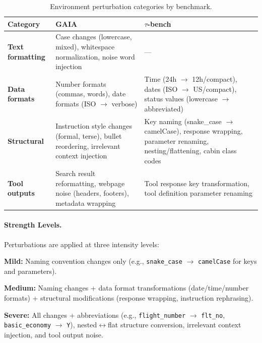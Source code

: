 \documentclass[11pt]{article}
\begin{document}
\begin{table}[h]
\centering
\renewcommand{\arraystretch}{1.2}
\small
\caption{Environment perturbation categories by benchmark.}
\label{tab:structural_perturbations}
\begin{tabularx}{\linewidth}{l X X}
\toprule
\textbf{Category} & \textbf{GAIA} & \textbf{$\tau$-bench} \\
\midrule
\textbf{Text formatting} & Case changes (lowercase, mixed), whitespace normalization, noise word injection & --- \\
\textbf{Data formats} & Number formats (commas, words), date formats (ISO $\to$ verbose) & Time (24h $\to$ 12h/compact), dates (ISO $\to$ US/compact), status values (lowercase $\to$ abbreviated) \\
\textbf{Structural} & Instruction style changes (formal, terse), bullet reordering, irrelevant context injection & Key naming (snake\_case $\to$ camelCase), response wrapping, parameter renaming, nesting/flattening, cabin class codes \\
\textbf{Tool outputs} & Search result reformatting, webpage noise (headers, footers), metadata wrapping & Tool response key transformation, tool definition parameter renaming \\
\bottomrule
\end{tabularx}
\end{table}

\paragraph{Strength Levels.}

Perturbations are applied at three intensity levels:

\begin{tcolorbox}[
    colback=gray!5!white,
    colframe=gray!50!black,
    title={\textbf{Perturbation Strength Presets}},
    fonttitle=\bfseries\small,
    boxrule=0.5pt,
    arc=2pt,
    breakable
]
\small
\textbf{Mild:} Naming convention changes only (e.g., \texttt{snake\_case} $\to$ \texttt{camelCase} for keys and parameters).

\textbf{Medium:} Naming changes + data format transformations (date/time/number formats) + structural modifications (response wrapping, instruction rephrasing).

\textbf{Severe:} All changes + abbreviations (e.g., \texttt{flight\_number} $\to$ \texttt{flt\_no}, \texttt{basic\_economy} $\to$ \texttt{Y}), nested$\leftrightarrow$flat structure conversion, irrelevant context injection, and tool output noise.
\end{tcolorbox}
\end{document}
